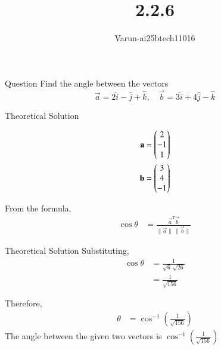 \documentclass{beamer}
\title %
{2.2.6}
\author %
{Varun-ai25btech11016}
\begin{document}
\frame{\titlepage}
\begin{frame}{Question}
  Find the angle between the vectors 
$$
\vec{a} = 2\hat{i} - \hat{j} + \hat{k}, \quad \vec{b} = 3\hat{i} + 4\hat{j} - \hat{k}
$$

\end{frame}



\begin{frame}{Theoretical Solution }

 \begin{align}
\mathbf{a} &= \begin{pmatrix}2 \\ -1 \\ 1\end{pmatrix} \\
\mathbf{b} &= \begin{pmatrix}3 \\ 4 \\ -1\end{pmatrix}
\end{align}

From the formula,
\begin{align}
\cos \theta &= \frac{\vec{a}^{T} \vec{b}}{\lVert \vec{a} \rVert \, \lVert \vec{b} \rVert}
\end{align}
\end{frame}
\begin{frame}{Theoretical Solution }
Substituting,
\begin{align}
\cos \theta &= \frac{1}{\sqrt{6}\,\sqrt{26}} \\
&= \frac{1}{\sqrt{156}} \nonumber
\end{align}

Therefore,
\begin{align}
\theta &= \cos^{-1}\left(\frac{1}{\sqrt{156}}\right)
\end{align}
The angle between the given two vectors is $\cos^{-1}\left(\frac{1}{\sqrt{156}}\right)$
\end{frame}
\end{document}
